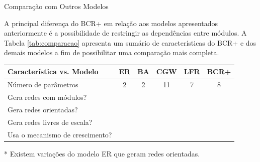 \begin{section}{Comparação com Outros Modelos}
	
	A principal diferença do BCR+ em relação aos modelos apresentados anteriormente é a possibilidade de restringir as dependências entre módulos. A Tabela \ref{tab:comparacao} apresenta um sumário de características do BCR+ e dos demais modelos a fim de possibilitar uma comparação mais completa.

\renewcommand{\S}{\CheckmarkBold}
\newcommand{\N}{\XSolidBrush}
	
\begin{threeparttable}[hb]
	\begin{center}
	\caption{Características do modelo BCR+ comparadas a características de outros modelos.}
	\label{tab:comparacao}
	\centering
	\begin{tabular}{|l|c|c|c|c|c|}
		\hline
		\textbf{Característica vs. Modelo} & \textbf{ER} & \textbf{BA} & \textbf{CGW} & \textbf{LFR} & \textbf{BCR+} \\
		\hline
		\hline
		Número de parâmetros                      & 2  &  2 & 11  & 7   &  8 \\
		\hline
		Gera redes com módulos?                   & \N & \N & \S & \S & \S \\
		\hline
		Gera redes orientadas?                    & \N\tnote{*} & \N & \S & \S & \S \\ \hline
		Gera redes livres de escala?              & \N & \S & \S & \S & \S \\
		\hline
		Usa o mecanismo de crescimento?           & \N & \S & \S & \N & \S \\
		\hline
	\end{tabular}
	\begin{tablenotes}
	\item[*] Existem variações do modelo ER que geram redes orientadas.
	\end{tablenotes}	
	\end{center}
\end{threeparttable}


\end{section}
